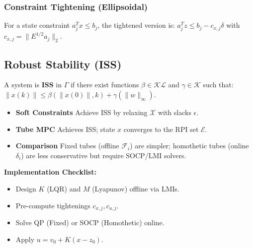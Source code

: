 \subsubsection{Constraint Tightening (Ellipsoidal)}

For a state constraint $a_j^T x \le b_j$, the tightened version is:
$a_j^T z \le b_j - c_{x,j} \delta$ with $c_{x,j} = \|E^{1/2} a_j\|_2$.

\subsection{Robust Stability (ISS)}

A system is \textbf{ISS} in $\Gamma$ if there exist functions $\beta \in
\mathcal{KL}$ and $\gamma \in \mathcal{K}$ such that:
$\|x(k)\| \le \beta(\|x(0)\|, k) + \gamma(\|w\|_\infty)$.
\begin{itemize}
  \item \textbf{Soft Constraints} Achieve ISS by relaxing $\mathcal{X}$
    with slacks $\epsilon$.
  \item \textbf{Tube MPC} Achieves ISS; state $x$ converges to the RPI
    set $\mathcal{E}$.
  \item \textbf{Comparison} Fixed tubes (offline $\mathcal{F}_i$) are
    simpler; homothetic tubes (online $\delta_i$) are less
    conservative but require SOCP/LMI solvers.
\end{itemize}

\begin{sstOnlyFrame}
  \textbf{Implementation Checklist:}
  \begin{itemize}
    \item [1] Design $K$ (LQR) and $M$ (Lyapunov) offline via LMIs.
    \item [2] Pre-compute tightenings $c_{x,j}, c_{u,j}$.
    \item [3] Solve QP (Fixed) or SOCP (Homothetic) online.
    \item [4] Apply $u = v_0 + K(x-z_0)$.
  \end{itemize}
\end{sstOnlyFrame}

